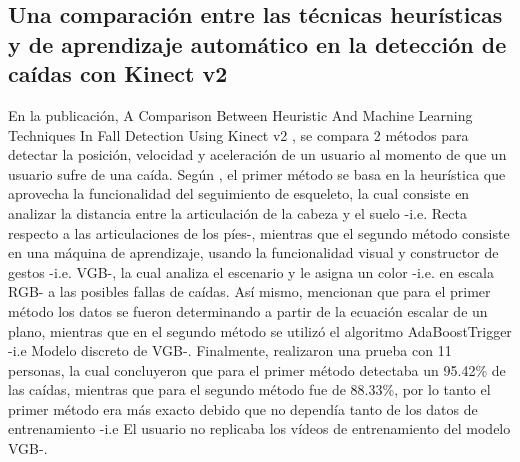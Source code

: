 \subsection{Una comparaci\'on entre las t\'ecnicas heur\'isticas y de aprendizaje autom\'atico en la detecci\'on de ca\'idas con Kinect v2} \label{tr:7}
En la publicaci\'on, A Comparison Between Heuristic And Machine Learning Techniques In Fall Detection Using Kinect v2 \cite{amini2016comparison}, se compara 2 m\'etodos para detectar la posici\'on, velocidad y aceleraci\'on de un usuario al momento de que un usuario sufre de una ca\'ida.
\medbreak 
Seg\'un , el primer m\'etodo se basa en la heur\'istica que aprovecha la funcionalidad del seguimiento de esqueleto, la cual consiste en analizar la distancia entre la articulaci\'on de la cabeza y el suelo -i.e. Recta respecto a las articulaciones de los p\'ies-, mientras que el segundo m\'etodo consiste en una m\'aquina de aprendizaje, usando la funcionalidad visual y constructor de gestos -i.e. VGB-, la cual analiza el escenario y le asigna un color -i.e. en escala RGB- a las posibles fallas de ca\'idas.
\medbreak 
As\'i mismo,  mencionan que para el primer m\'etodo los datos se fueron determinando a partir de la ecuaci\'on escalar de un plano, mientras que en el segundo m\'etodo se utiliz\'o el algoritmo AdaBoostTrigger -i.e Modelo discreto de VGB-.
\medbreak 
Finalmente,  realizaron una prueba con 11 personas, la cual concluyeron que para el primer m\'etodo detectaba un 95.42\% de las ca\'idas, mientras que para el segundo m\'etodo fue de 88.33\%, por lo tanto el primer m\'etodo era m\'as exacto debido que no depend\'ia tanto de los datos de entrenamiento -i.e El usuario no replicaba los v\'ideos de entrenamiento del modelo VGB-.
